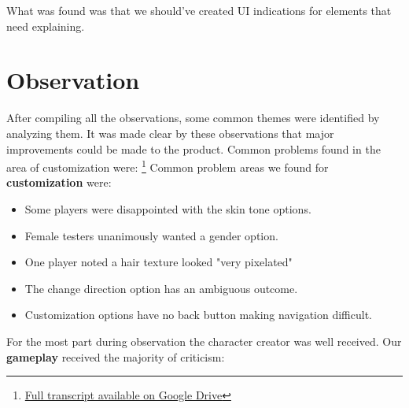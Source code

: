 \documentclass[twoside,twocolumn]{article}
\begin{document}
What was found was that we should've created UI indications for elements that need explaining.


\section{Observation}

After compiling all the observations, some common themes were identified by analyzing them.
 It was made clear by these observations that major improvements could be made to the product.
  Common problems found in the area of customization were:
\footnote{\hyperlink{https://docs.google.com/document/d/1CnQ9mCSRhZsAQdpiiN130khrFRj5-IsULWaGTs2_KgE/edit?usp=sharing}{Full transcript available on Google Drive}}
 Common problem areas we
found for \textbf{customization} were:
\begin{itemize}
    \item Some players were disappointed with the skin tone options.
    \item Female testers unanimously wanted a gender option.
    \item One player noted a hair texture looked "very pixelated"
    \item The change direction option has an ambiguous outcome.
    \item Customization options have no back button making navigation difficult.
\end{itemize}
For the most part during observation the character creator was well received. Our \textbf{gameplay}
received the majority of criticism:
\end{document}
